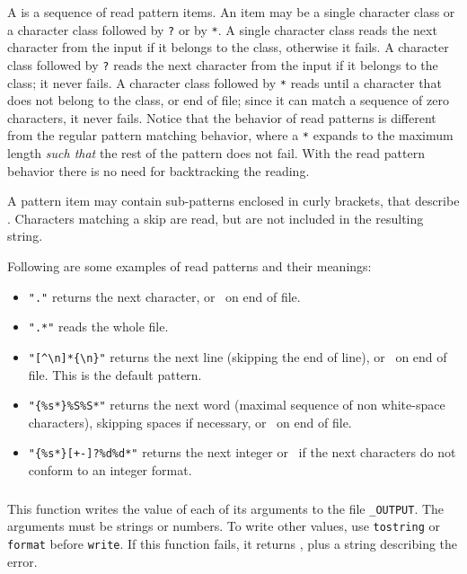 A  is a sequence of read pattern items.
An item may be a single character class
or a character class followed by \verb|?| or by \verb|*|.
A single character class reads the next character from the input
if it belongs to the class, otherwise it fails.
A character class followed by \verb|?| reads the next character
from the input if it belongs to the class;
it never fails.
A character class followed by \verb|*| reads until a character that
does not belong to the class, or end of file;
since it can match a sequence of zero characters, it never fails.
Notice that the behavior of read patterns is different from
the regular pattern matching behavior,
where a \verb|*| expands to the maximum length \emph{such that}
the rest of the pattern does not fail.
With the read pattern behavior
there is no need for backtracking the reading.

A pattern item may contain sub-patterns enclosed in curly brackets,
that describe .
Characters matching a skip are read,
but are not included in the resulting string.

Following are some examples of read patterns and their meanings:
\begin{itemize}
\item \verb|"."| returns the next character, or \nil\ on end of file.
\item \verb|".*"| reads the whole file.
\item \verb|"[^\n]*{\n}"| returns the next line
(skipping the end of line), or \nil\ on end of file.
This is the default pattern.
\item \verb|"{%s*}%S%S*"| returns the next word
(maximal sequence of non white-space characters),
skipping spaces if necessary,
or \nil\ on end of file.
\item \verb|"{%s*}[+-]?%d%d*"| returns the next integer
or \nil\ if the next characters do not conform to an integer format.
\end{itemize}

\subsubsection*{\ff {}}

This function writes the value of each of its arguments to the
file \verb|_OUTPUT|.
The arguments must be strings or numbers.
To write other values,
use \verb|tostring| or \verb|format| before \verb|write|.
If this function fails, it returns \nil,
plus a string describing the error.


